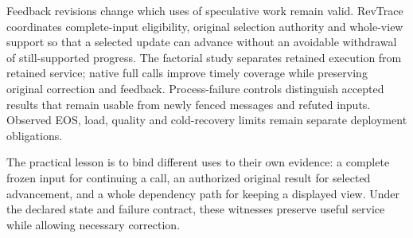 Feedback revisions change which uses of speculative work remain valid.
RevTrace coordinates complete-input eligibility, original selection
authority and whole-view support so that a selected update can advance
without an avoidable withdrawal of still-supported progress. The
factorial study separates retained execution from retained service;
native full calls improve timely coverage while preserving original
correction and feedback. Process-failure controls distinguish accepted
results that remain usable from newly fenced messages and refuted inputs. Observed EOS, load, quality and cold-recovery limits remain separate
deployment obligations.

The practical lesson is to bind different uses to their own evidence:
a complete frozen input for continuing a call, an authorized original
result for selected advancement, and a whole dependency path for keeping
a displayed view. Under the declared state and failure contract, these
witnesses preserve useful service while allowing necessary correction.
